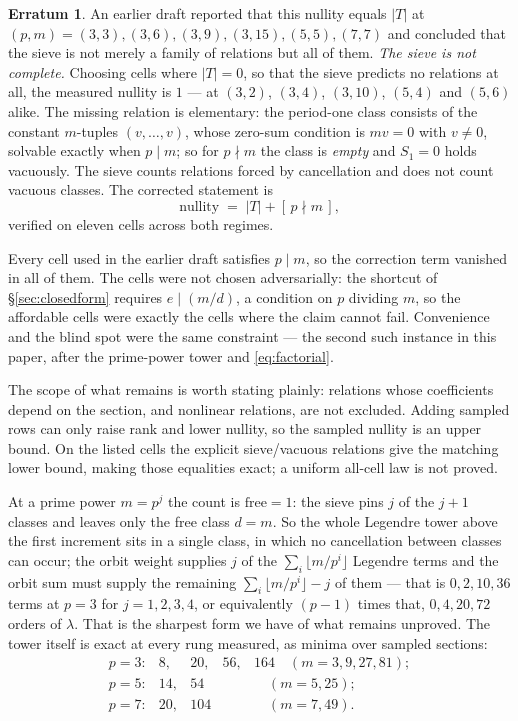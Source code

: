 \documentclass[11pt]{article}
\theoremstyle{plain}
\theoremstyle{definition}
\newtheorem{erratum}[theorem]{Erratum}
\begin{document}
\begin{erratum}\label{err:complete}
An earlier draft reported that this nullity equals $\lvert T\rvert$ at
$(p,m)=(3,3),(3,6),(3,9),(3,15),(5,5),(7,7)$ and concluded that the sieve is
not merely a family of relations but all of them. \emph{The sieve is not
complete.} Choosing cells where $\lvert T\rvert=0$, so that the sieve predicts
no relations at all, the measured nullity is $1$ --- at $(3,2)$, $(3,4)$,
$(3,10)$, $(5,4)$ and $(5,6)$ alike. The missing relation is elementary: the
period-one class consists of the constant $m$-tuples $(v,\dots,v)$, whose
zero-sum condition is $mv=0$ with $v\neq0$, solvable exactly when $p\mid m$; so
for $p\nmid m$ the class is \emph{empty} and $S_1=0$ holds vacuously. The sieve
counts relations forced by cancellation and does not count vacuous classes. The
corrected statement is
\[
\text{nullity}\;=\;\lvert T\rvert+[\,p\nmid m\,],
\]
verified on eleven cells across both regimes.

Every cell used in the earlier draft satisfies $p\mid m$, so the correction term
vanished in all of them. The cells were not chosen adversarially: the shortcut
of \S\ref{sec:closedform} requires $e\mid(m/d)$, a condition on $p$ dividing
$m$, so the affordable cells were exactly the cells where the claim cannot
fail. Convenience and the blind spot were the same constraint --- the second
such instance in this paper, after the prime-power tower and
\eqref{eq:factorial}.
\end{erratum}

\noindent The scope of what remains is worth stating plainly: relations whose
coefficients depend on the section, and nonlinear relations, are not excluded.
Adding sampled rows can only raise
rank and lower nullity, so the sampled nullity is an upper bound.  On the
listed cells the explicit sieve/vacuous relations give the matching lower
bound, making those equalities exact; a uniform all-cell law is not proved.

At a prime power $m=p^{j}$ the count is
$\mathrm{free}=1$: the sieve pins $j$ of the $j+1$ classes and leaves only the
free class $d=m$. So the whole Legendre tower above the first increment sits in
a single class, in which no cancellation between classes can occur; the orbit
weight supplies $j$ of the $\sum_i\lfloor m/p^i\rfloor$ Legendre terms and the
orbit sum must supply the remaining $\sum_i\lfloor m/p^i\rfloor-j$ of them ---
that is $0,2,10,36$ terms at $p=3$ for $j=1,2,3,4$, or equivalently
$(p-1)$ times that, $0,4,20,72$ orders of $\lambda$. That is the sharpest form
we have of what remains unproved. The tower itself is exact at every rung
measured, as minima over sampled sections:
\[
\begin{array}{lllll}
p=3: & 8, & 20, & 56, & 164 \quad (m=3,9,27,81);\\
p=5: & 14, & 54 & & \quad (m=5,25);\\
p=7: & 20, & 104 & & \quad (m=7,49).
\end{array}
\]
\end{document}
